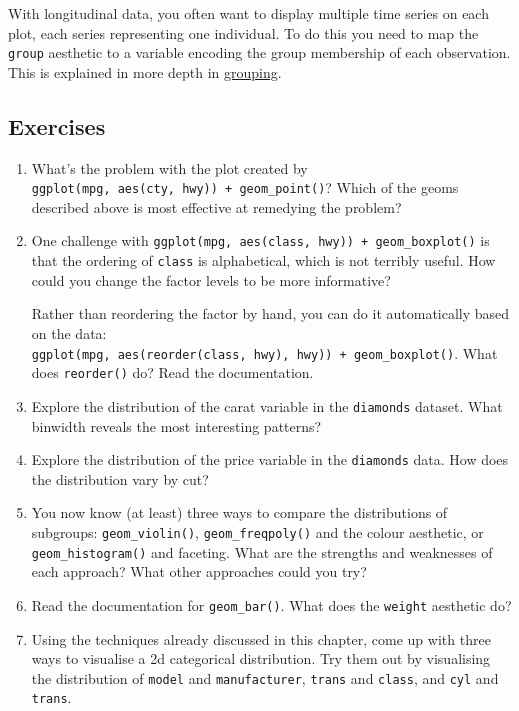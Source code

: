 With longitudinal data, you often want to display multiple time series
on each plot, each series representing one individual. To do this you
need to map the \texttt{group} aesthetic to a variable encoding the
group membership of each observation. This is explained in more depth in
\hyperref[sec:grouping]{grouping}.

\subsection{Exercises}

\begin{enumerate}
\def\labelenumi{\arabic{enumi}.}
\item
  What's the problem with the plot created by
  \texttt{ggplot(mpg,\ aes(cty,\ hwy))\ +\ geom\_point()}? Which of the
  geoms described above is most effective at remedying the problem?
\item
  One challenge with
  \texttt{ggplot(mpg,\ aes(class,\ hwy))\ +\ geom\_boxplot()} is that
  the ordering of \texttt{class} is alphabetical, which is not terribly
  useful. How could you change the factor levels to be more informative?

  Rather than reordering the factor by hand, you can do it automatically
  based on the data:
  \texttt{ggplot(mpg,\ aes(reorder(class,\ hwy),\ hwy))\ +\ geom\_boxplot()}.
  What does \texttt{reorder()} do? Read the documentation.
\item
  Explore the distribution of the carat variable in the
  \texttt{diamonds} dataset. What binwidth reveals the most interesting
  patterns?
\item
  Explore the distribution of the price variable in the
  \texttt{diamonds} data. How does the distribution vary by cut?
\item
  You now know (at least) three ways to compare the distributions of
  subgroups: \texttt{geom\_violin()}, \texttt{geom\_freqpoly()} and the
  colour aesthetic, or \texttt{geom\_histogram()} and faceting. What are
  the strengths and weaknesses of each approach? What other approaches
  could you try?
\item
  Read the documentation for \texttt{geom\_bar()}. What does the
  \texttt{weight} aesthetic do?
\item
  Using the techniques already discussed in this chapter, come up with
  three ways to visualise a 2d categorical distribution. Try them out by
  visualising the distribution of \texttt{model} and
  \texttt{manufacturer}, \texttt{trans} and \texttt{class}, and
  \texttt{cyl} and \texttt{trans}.
\end{enumerate}

